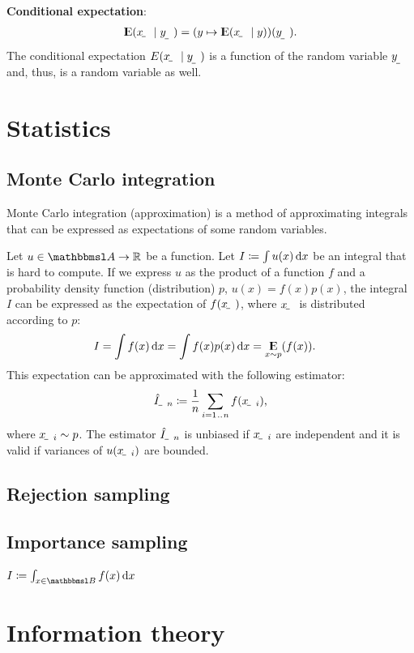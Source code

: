 \documentclass[oneside]{book}
\begin{document}
\textbf{Conditional expectation}:
\begin{align}
    \E\del{\rvar x\mid\rvar y} = \del{y\mapsto \E\del{\rvar x\mid y}}(\rvar{y}) \text.
\end{align}
The conditional expectation $E\del{\rvar x\mid\rvar y}$ is a function of the random variable $\rvar y$ and, thus, is a random variable as well. 

\section{Statistics}

\subsection{Monte Carlo integration}

Monte Carlo integration (approximation) is a method of approximating integrals that can be expressed as expectations of some random variables.

Let $u\in \set A\to \R$ be a function. Let $I\coloneqq\int u(x)\operatorname{d\!} x$ be an integral that is hard to compute. If we express $u$ as the product of a function $f$ and a probability density function (distribution) $p$, $u(x) = f(x)p(x)$, the integral $I$ can be expressed as the expectation of $f(\rvar x)$, where $\rvar x$ is distributed according to $p$:
\begin{align}
    I &= \int f(x)\operatorname{d\!} x = \int f(x)p(x)\operatorname{d\!} x = \operatorname*{\mathrm{I\kern-.282em E}}_{x\sim p}(f(x)) \text .
\end{align}
This expectation can be approximated with the following estimator:
\begin{align} 
    \rvar{\hat I}_n \coloneqq \frac{1}{n}\sum_{i=1\bidot n} f(\rvar x_i) \text{,}
\end{align}
where $\rvar x_i\sim p$. The estimator $\rvar{\hat I}_n$ is unbiased if $\rvar x_i$ are independent and it is valid if variances of $u(\rvar x_i)$ are bounded.

\subsection{Rejection sampling}

\subsection{Importance sampling}
$I\coloneqq\int_{x\in \set B}f(x)\dif x$

\section{Information theory}
\end{document}
